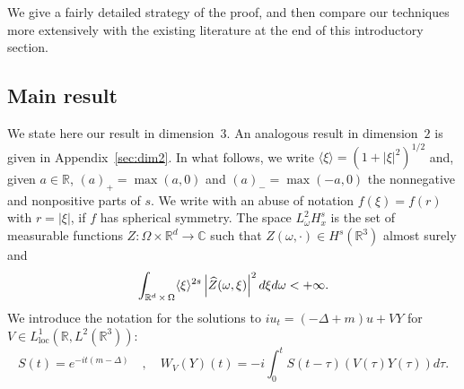 \documentclass[AHL, Unicode, longabstracts,published]{cedram}
\newcommand{\R}{\mathbb{R}}
\newcommand{\C}{\mathbb{C}}
\newcommand{\loc}{\mathrm{loc}}
\let\oldhat\hat
\renewcommand*{\hat}[1]{\mathchoice{\widehat{#1}}{\widehat{#1}}{\oldhat{#1}}{\oldhat{#1}}}
\begin{document}
We give a fairly detailed strategy of the proof, and then compare our techniques more extensively with the existing literature at the end of this introductory section.



\subsection{Main result}

We state here our result in dimension~$3$. An analogous result in dimension~$2$ is given in Appendix~\ref{sec:dim2}. In what follows, we write $\langle \xi \rangle =(1+|\xi|^2)^{1/2}$ and, given $a\in \R$, $(a)_+=\max (a,0)$ and $(a)_-=\max (-a,0)$ the nonnegative and nonpositive parts of $s$. We write with an abuse of notation $f(\xi)=f(r)$ with $r=|\xi|$, if $f$ has spherical symmetry. The space $L^2_\omega H^{s}_x$ is the set of measurable functions $Z: \Omega \times \R^d \rightarrow \C$ such that $Z(\omega, \cdot)\in H^s(\R^3)$ almost surely and
\[
\int_{\R^d\,\times\,\Omega} \langle \xi \rangle^{2s} \left|\hat Z(\omega, \xi)\right|^2d\xi d \omega<+\infty.
\]
We introduce the notation for the solutions to $iu_t=(-\Delta +m)u+V Y$ for $V \in L^1_{\loc}(\R, L^2(\R^3)) $:
\begin{equation} \label{def:WV}
S(t) = e^{-it(m-\Delta)} \quad, \quad W_V(Y)(t) = -i\int_0^{t} S(t-\tau) (V(\tau) Y(\tau))d\tau.
\end{equation}
\end{document}
